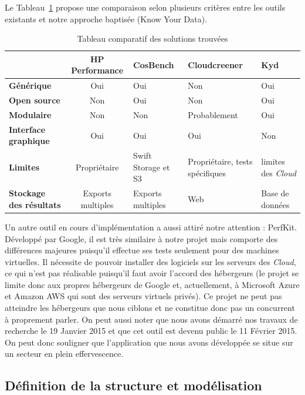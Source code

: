 \documentclass[10pt]{article}
\begin{document}
Le Tableau~\ref{tab:compar} propose une comparaison selon plusieurs
critères entre les outils existants et notre approche baptisée \KYD
(Know Your Data).

\begin{table}[h] \caption{Tableau comparatif des solutions trouvées \label{tab:compar}}
\renewcommand{\arraystretch}{1.5} \begin{center}
\begin{tabular}{|p{2cm}|c|p{2cm}|p{3cm}|p{2cm}|} \hline & \bf HP Performance &
\bf CosBench & \bf Cloudcreener & \bf Kyd  \\ \hline \bf\centering Générique &
Oui & Oui & Non & Oui \\ \hline \bf\centering Open source & Non & Oui & Non &
Oui \\ \hline \bf\centering Modulaire & Non & Non & Probablement & Oui \\
\hline \bf\centering Interface graphique & Oui & Oui & Oui & Non \\ \hline
\bf\centering Limites & Propriétaire & Swift Storage et S3 & Propriétaire,
tests spécifiques & limites des \textit{Cloud} \\ \hline \bf\centering Stockage
des résultats & Exports multiples & Exports multiples & Web & Base de données
\\ \hline \end{tabular} 
\end{center} \end{table}

Un autre outil en cours d'implémentation a aussi attiré notre
attention : PerfKit. Développé par Google, il est très similaire à
notre projet mais comporte des différences majeures puisqu'il effectue
ses tests seulement pour des machines virtuelles. Il nécessite de
pouvoir installer des logiciels sur les serveurs des \textit{Cloud},
ce qui n'est pas réalisable puisqu'il faut avoir l'accord des
hébergeurs (le projet se limite donc aux propres hébergeurs de Google
et, actuellement, à Microsoft Azure et Amazon AWS qui sont des
serveurs virtuels privés). Ce projet ne peut pas atteindre les
hébergeurs que nous ciblons et ne constitue donc pas un concurrent à
proprement parler. On peut aussi noter que nous avons démarré nos
travaux de recherche le 19 Janvier 2015 et que cet outil est devenu
public le 11 Février 2015. On peut donc souligner que l’application
que nous avons développée se situe sur un secteur en plein
effervescence.

\subsection{Définition de la structure et modélisation}
\end{document}
